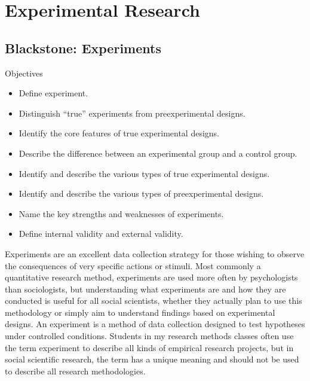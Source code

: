 \chapter{Experimental Research}\label{ch10:experimental_research}

\section{Blackstone: Experiments}

\begin{center}
	\begin{objbox}{Objectives}
		\begin{itemize}
			\setlength{\itemsep}{0pt}
			\setlength{\parskip}{0pt}
			\setlength{\parsep}{0pt}
			
			\item Define experiment.
			\item Distinguish “true” experiments from preexperimental designs.
			\item Identify the core features of true experimental designs.
			\item Describe the difference between an experimental group and a control group.
			\item Identify and describe the various types of true experimental designs.
			\item Identify and describe the various types of preexperimental designs.
			\item Name the key strengths and weaknesses of experiments.
			\item Define internal validity and external validity.
			
		\end{itemize}
	\end{objbox}
\end{center}

Experiments are an excellent data collection strategy for those wishing to observe the consequences of very specific actions or stimuli. Most commonly a quantitative research method, experiments are used more often by psychologists than sociologists, but understanding what experiments are and how they are conducted is useful for all social scientists, whether they actually plan to use this methodology or simply aim to understand findings based on experimental designs. An experiment is a method of data collection designed to test hypotheses under controlled conditions. Students in my research methods classes often use the term experiment to describe all kinds of empirical research projects, but in social scientific research, the term has a unique meaning and should not be used to describe all research methodologies.

